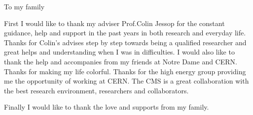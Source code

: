 \documentclass[final,numrefs,sort&compress,noinfo]{nddiss2e}
\begin{document}
\begin{dedication}
To my family 
\end{dedication}

\tableofcontents
{%
\let\oldnumberline\numberline%
\renewcommand{\numberline}{\figurename~\oldnumberline}%
\listoffigures%
}

{%
\let\oldnumberline\numberline%
\renewcommand{\numberline}{\tablename~\oldnumberline}%
\listoftables%
}




\begin{acknowledge}

First I would like to thank my adviser Prof.Colin Jessop for the constant guidance, help and support in the past years in both research and everyday life. Thanks for Colin's advises step by step towards being a qualified researcher and great helps and understanding when I was in difficulties. I would also like to thank the help and accompanies from my friends at Notre Dame and CERN. Thanks for making my life colorful. Thanks for the high energy group providing me the opportunity of working at CERN. The CMS is a great collaboration with the best research environment, researchers and collaborators. 

Finally I would like to thank the love and supports from my family.  

 


\end{acknowledge}


\mainmatter





%
%



%
%


%
%


%
%


%
%


%
%
\end{document}
